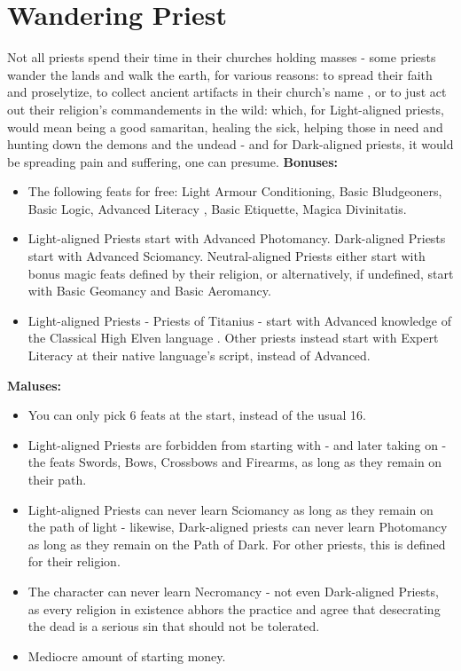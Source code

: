 \section{Wandering Priest}
Not all priests spend their time in their churches holding masses - some priests wander the lands and walk the earth, for various reasons: to spread their faith and proselytize, to collect ancient artifacts in their church's name , or to just act out their religion's commandements in the wild: which, for Light-aligned priests, would mean being a good samaritan, healing the sick, helping those in need and hunting down the demons and the undead - and for Dark-aligned priests, it would be spreading pain and suffering, one can presume. \newline
\textbf{Bonuses:}
\begin{itemize}
	\item The following feats for free: Light Armour Conditioning, Basic Bludgeoners, Basic Logic, Advanced Literacy , Basic Etiquette, Magica Divinitatis.
	\item Light-aligned Priests start with Advanced Photomancy. Dark-aligned Priests start with Advanced Sciomancy. Neutral-aligned Priests either start with bonus magic feats defined by their religion, or alternatively, if undefined, start with Basic Geomancy and Basic Aeromancy.
	\item Light-aligned Priests - Priests of Titanius - start with Advanced knowledge of the Classical High Elven language . Other priests instead start with Expert Literacy at their native language's script, instead of Advanced.
\end{itemize}
\textbf{Maluses:}
\begin{itemize}
	\item You can only pick 6 feats at the start, instead of the usual 16.
	\item Light-aligned Priests are forbidden from starting with - and later taking on - the feats Swords, Bows, Crossbows and Firearms, as long as they remain on their path.
	\item Light-aligned Priests can never learn Sciomancy as long as they remain on the path of light - likewise, Dark-aligned priests can never learn Photomancy as long as they remain on the Path of Dark. For other priests, this is defined for their religion.
	\item The character can never learn Necromancy - not even Dark-aligned Priests, as every religion in existence  abhors the practice and agree that desecrating the dead is a serious sin that should not be tolerated.
	\item Mediocre amount of starting money.
\end{itemize}
